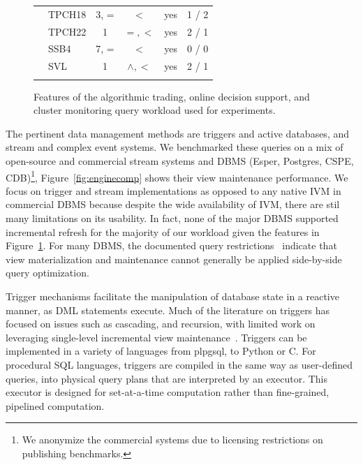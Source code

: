 \begin{figure}[t]
{\begin{center}
\begin{tabular}{ p{0.15cm} | l | c | c | c  | c }
& TPCH18     & 3, =      & $<$           & yes & 1 / 2 \\
& TPCH22     & 1         & $=,<$         & yes & 2 / 1 \\
& SSB4       & 7, =      & $<$           & yes & 0 / 0 \\
\hline
\comment{
& SVL        & 1         & $\wedge, <$   & yes & 2 / 1 \\
}
\end{tabular}
\end{center}
}
\vspace{-4mm}
\caption{Features of the algorithmic trading, online decision support, and
cluster monitoring query workload used for experiments.}
\label{fig:queries}
\vspace{-4mm}
\end{figure}

The pertinent data management methods are triggers and active databases, and
stream and complex event systems.
We benchmarked these queries on a mix of open-source and commercial stream
systems and DBMS (Esper, Postgres, CSPE, CDB)\footnote{We anonymize the
commercial systems due to licensing restrictions on publishing benchmarks.},
Figure~\ref{fig:enginecomp} shows their view maintenance performance.
We focus on trigger and stream implementations as opposed to any native IVM in
commercial DBMS because despite the wide availability of IVM, there are stil
many limitations on its usability.
In fact, none of the major DBMS supported incremental refresh for the
majority of our workload given the features in Figure~\ref{fig:queries}.
For many DBMS, the documented query
restrictions~\cite{db2-viewrestrict,mssql-viewrestrict,oracle-viewrestrict}
indicate that view materialization and maintenance cannot generally be applied
side-by-side query optimization.

\vspace{1mm}
Trigger mechanisms facilitate the manipulation of database state in a reactive
manner, as DML statements execute.
Much of the literature on triggers has focused on issues such as cascading, and
recursion, with limited work on leveraging single-level incremental view
maintenance~\cite{baralis-rids95}.
Triggers can be implemented in a variety of languages from plpgsql, to Python or
C. For procedural SQL languages, triggers are compiled in the same
way as user-defined queries, into physical query plans that are interpreted by
an executor.
This executor is designed for set-at-a-time computation rather than
fine-grained, pipelined computation. 

